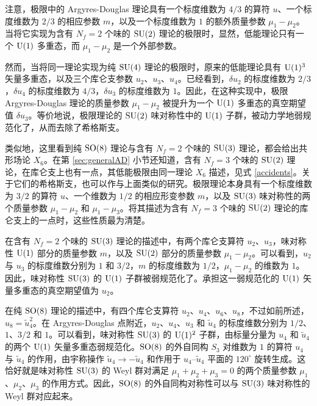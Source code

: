 注意，极限中的 Argyres-Douglas 理论具有一个标度维数为 $4/3$ 的算符 $u$、一个标度维数为 $2/3$ 的相应参数 $m$，以及一个标度维数为 $1$ 的额外质量参数 $\mu_1-\mu_2$。当将它实现为含有 $N_f=2$ 个味的 $\mathop{\mathrm{SU}}(2)$ 理论的极限时，显然，低能理论只有一个 ${\mathrm{U}}(1)$ 多重态，而 $\mu_1-\mu_2$ 是一个外部参数。

然而，当将同一理论实现为纯 $\mathop{\mathrm{SU}}(4)$ 理论的极限时，原来的低能理论具有 ${\mathrm{U}}(1)^3$ 矢量多重态，以及三个库仑支参数 $u_2$、$u_3$、$u_4$。已经看到，$\delta u_2$ 的标度维数为 $2/3$，$\delta u_4$ 的标度维数为 $4/3$，$\delta u_3$ 的标度维数为 $1$。因此，在这种实现中，极限 Argyres-Douglas 理论的质量参数 $\mu_1-\mu_2$ 被提升为一个 ${\mathrm{U}}(1)$ 多重态的真空期望值 $\delta u_3$。等价地说，极限理论的 $\mathop{\mathrm{SU}}(2)$ 味对称性中的 ${\mathrm{U}}(1)$ 子群，被动力学地弱规范化了，从而去除了希格斯支。

类似地，这里看到纯 $\mathop{\mathrm{SO}}(8)$ 理论与含有 $N_f=2$ 个味的 $\mathop{\mathrm{SU}}(3)$ 理论，都会给出共形场论 $X_6$。在第 \ref{sec:generalAD} 小节还知道，含有 $N_f=3$ 个味的 $\mathop{\mathrm{SU}}(2)$ 理论，在库仑支上也有一点，其低能极限由同一理论 $X_6$ 描述，见式 \eqref{accidents}。关于它们的希格斯支，也可以作与上面类似的研究。极限理论本身具有一个标度维数为 $3/2$ 的算符 $u$、一个维数为 $1/2$ 的相应形变参数 $m$，以及 $\mathop{\mathrm{SU}}(3)$ 味对称性的两个质量参数 $\mu_1-\mu_2$ 和 $\mu_1-\mu_3$。将其描述为含有 $N_f=3$ 个味的 $\mathop{\mathrm{SU}}(2)$ 理论的库仑支上的一点时，这些性质最为清楚。

在含有 $N_f=2$ 个味的 $\mathop{\mathrm{SU}}(3)$ 理论的描述中，有两个库仑支算符 $u_2$、$u_3$，味对称性 ${\mathrm{U}}(1)$ 部分的质量参数 $m$，以及 $\mathop{\mathrm{SU}}(2)$ 部分的质量参数 $\mu_1-\mu_2$。可以看到，$u_2$ 与 $u_3$ 的标度维数分别为 $1$ 和 $3/2$，$m$ 的标度维数为 $1/2$，$\mu_1-\mu_2$ 的维数为 $1$。因此，味对称性 $\mathop{\mathrm{SU}}(3)$ 的 ${\mathrm{U}}(1)$ 子群被弱规范化了。承担这一弱规范化的 ${\mathrm{U}}(1)$ 矢量多重态的真空期望值为 $u_2$。

在纯 $\mathop{\mathrm{SO}}(8)$ 理论的描述中，有四个库仑支算符 $u_2$、$u_4$、$u_6$、$u_8$，不过如前所述，$u_8=\tilde u_4^2$。在 Argyres-Douglas 点附近，$u_2$、$u_4$、$u_3$ 和 $\tilde u_4$ 的标度维数分别为 $1/2$、$1$、$3/2$ 和 $1$。可以看到，味对称性 $\mathop{\mathrm{SU}}(3)$ 的 ${\mathrm{U}}(1)^2$ 子群，由标量分量为 $u_4$ 和 $\tilde u_4$ 的两个 ${\mathrm{U}}(1)$ 矢量多重态弱规范化。$\mathop{\mathrm{SO}}(8)$ 的外自同构 $S_3$ 对维数为 $1$ 的算符 $u_4$ 与 $\tilde u_4$ 的作用，由宇称操作 $\tilde u_4\to-\tilde u_4$ 和作用于 $u_4$--$\tilde u_4$ 平面的 $120^\circ$ 旋转生成。这恰好就是味对称性 $\mathop{\mathrm{SU}}(3)$ 的 Weyl 群对满足 $\mu_1+\mu_2+\mu_3=0$ 的两个质量参数 $\mu_1$、$\mu_2$、$\mu_3$ 的作用方式。因此，$\mathop{\mathrm{SO}}(8)$ 的外自同构对称性可以与 $\mathop{\mathrm{SU}}(3)$ 味对称性的 Weyl 群对应起来。

